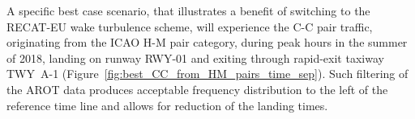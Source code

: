A specific best case scenario, that illustrates a benefit of switching to the RECAT-EU wake turbulence scheme, will experience the C-C pair traffic, originating from the ICAO H-M pair category, during peak hours in the summer of 2018, landing on runway RWY-01 and exiting through rapid-exit taxiway TWY~A-1 (Figure~\ref{fig:best_CC_from_HM_pairs_time_sep}). Such filtering of the AROT data produces acceptable frequency distribution to the left of the reference time line and allows for reduction of the landing times.

\begin{figure}[h]
    \centering
    
    

\end{figure}
